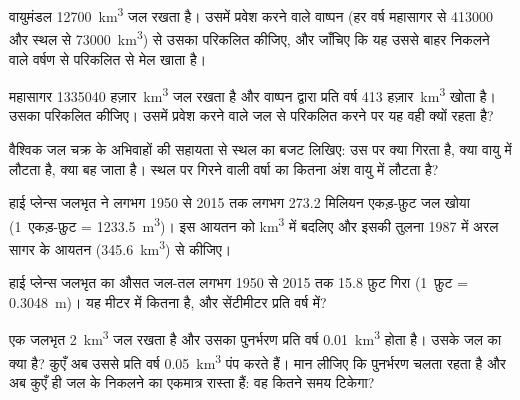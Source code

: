 \begin{exercise}[$\star\star$]\label{exo:g10:freshwater-resources:6}
वायुमंडल \num{12700}~\unit{km^3} जल रखता है। उसमें प्रवेश करने वाले वाष्पन
(हर वर्ष महासागर से \num{413000} और स्थल से \num{73000}~\unit{km^3}) से उसका  परिकलित कीजिए, और जाँचिए कि यह उससे बाहर निकलने वाले वर्षण से परिकलित 
से मेल खाता है।
\end{exercise}

\begin{exercise}[$\star\star$]\label{exo:g10:freshwater-resources:7}
महासागर \num{1335040} हज़ार~\unit{km^3} जल रखता है और
वाष्पन द्वारा प्रति वर्ष \num{413} हज़ार~\unit{km^3} खोता है। उसका  परिकलित कीजिए। उसमें प्रवेश करने वाले जल से परिकलित करने पर यह वही क्यों रहता है?
\end{exercise}

\begin{exercise}[$\star\star$]\label{exo:g10:freshwater-resources:8}
वैश्विक जल चक्र के अभिवाहों की सहायता से स्थल का बजट लिखिए: उस पर क्या
गिरता है, क्या वायु में लौटता है, क्या बह जाता है। स्थल पर गिरने वाली वर्षा का
कितना अंश वायु में लौटता है?
\end{exercise}

\begin{exercise}[$\star\star$]\label{exo:g10:freshwater-resources:9}
हाई प्लेन्स जलभृत ने लगभग 1950 से 2015 तक लगभग \num{273.2} मिलियन एकड़-फ़ुट जल
खोया (\num{1}~एकड़-फ़ुट = \qty{1233.5}{m^3})। इस आयतन को
\unit{km^3} में बदलिए और इसकी तुलना 1987 में अरल सागर के आयतन
(\qty{345.6}{km^3}) से कीजिए।
\end{exercise}

\begin{exercise}[$\star\star$]\label{exo:g10:freshwater-resources:10}
हाई प्लेन्स जलभृत का औसत जल-तल लगभग 1950 से 2015 तक \num{15.8} फ़ुट
गिरा (\num{1}~फ़ुट = \qty{0.3048}{m})। यह मीटर में कितना है,
और सेंटीमीटर प्रति वर्ष में?
\end{exercise}

\begin{exercise}[$\star\star$]\label{exo:g10:freshwater-resources:11}
एक जलभृत \qty{2}{km^3} जल रखता है और उसका पुनर्भरण
प्रति वर्ष \qty{0.01}{km^3} होता है। उसके जल का  क्या है? कुएँ अब
उससे प्रति वर्ष \qty{0.05}{km^3} पंप करते हैं। मान लीजिए कि पुनर्भरण चलता रहता है और
अब कुएँ ही जल के निकलने का एकमात्र रास्ता हैं: वह कितने समय
टिकेगा?
\end{exercise}

